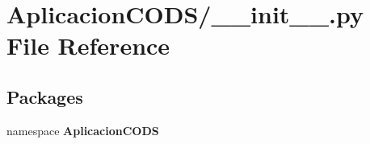 \section{\-Aplicacion\-C\-O\-D\-S/\-\_\-\-\_\-init\-\_\-\-\_\-.py \-File \-Reference}
\label{_aplicacion_c_o_d_s_2____init_____8py}
\subsection*{\-Packages}
\begin{DoxyCompactItemize}
\item 
namespace {\bf \-Aplicacion\-C\-O\-D\-S}
\end{DoxyCompactItemize}

